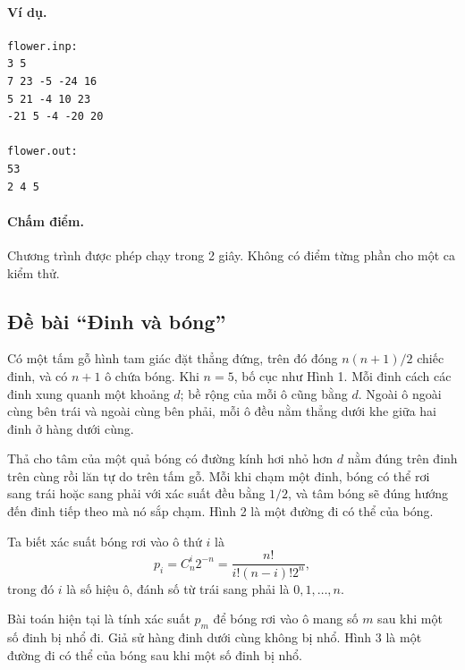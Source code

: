 \documentclass[11pt]{article}
\begin{document}
\paragraph{Ví dụ.}
\begin{verbatim}
flower.inp:
3 5
7 23 -5 -24 16
5 21 -4 10 23
-21 5 -4 -20 20

flower.out:
53
2 4 5
\end{verbatim}

\paragraph{Chấm điểm.}
Chương trình được phép chạy trong 2 giây. Không có điểm từng phần cho một ca
kiểm thử.

\subsection{Đề bài ``Đinh và bóng''}

Có một tấm gỗ hình tam giác đặt thẳng đứng, trên đó đóng \(n(n+1)/2\) chiếc
đinh, và có \(n+1\) ô chứa bóng. Khi \(n=5\), bố cục như Hình 1. Mỗi đinh
cách các đinh xung quanh một khoảng \(d\); bề rộng của mỗi ô cũng bằng \(d\).
Ngoài ô ngoài cùng bên trái và ngoài cùng bên phải, mỗi ô đều nằm thẳng dưới
khe giữa hai đinh ở hàng dưới cùng.

Thả cho tâm của một quả bóng có đường kính hơi nhỏ hơn \(d\) nằm đúng trên
đinh trên cùng rồi lăn tự do trên tấm gỗ. Mỗi khi chạm một đinh, bóng có thể
rơi sang trái hoặc sang phải với xác suất đều bằng \(1/2\), và tâm bóng sẽ
đúng hướng đến đinh tiếp theo mà nó sắp chạm. Hình 2 là một đường đi có thể
của bóng.

Ta biết xác suất bóng rơi vào ô thứ \(i\) là
\[
  p_i=C_n^i 2^{-n}=\frac{n!}{i!(n-i)!2^n},
\]
trong đó \(i\) là số hiệu ô, đánh số từ trái sang phải là \(0,1,\ldots,n\).

Bài toán hiện tại là tính xác suất \(p_m\) để bóng rơi vào ô mang số \(m\)
sau khi một số đinh bị nhổ đi. Giả sử hàng đinh dưới cùng không bị nhổ. Hình
3 là một đường đi có thể của bóng sau khi một số đinh bị nhổ.
\end{document}
